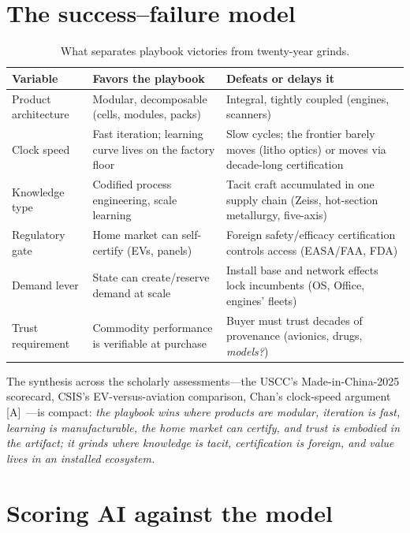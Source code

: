 \section{The success--failure model}

\begin{table}[htbp]
  \centering
  \small
  \caption{What separates playbook victories from twenty-year grinds.}
  \label{tab:analogy-model}
  \begin{tabular}{p{40mm}p{48mm}p{54mm}}
    \toprule
    Variable & Favors the playbook & Defeats or delays it \\
    \midrule
    Product architecture & Modular, decomposable (cells, modules, packs) & Integral, tightly coupled (engines, scanners) \\
    Clock speed & Fast iteration; learning curve lives on the factory floor & Slow cycles; the frontier barely moves (litho optics) or moves via decade-long certification \\
    Knowledge type & Codified process engineering, scale learning & Tacit craft accumulated in one supply chain (Zeiss, hot-section metallurgy, five-axis) \\
    Regulatory gate & Home market can self-certify (EVs, panels) & Foreign safety/efficacy certification controls access (EASA/FAA, FDA) \\
    Demand lever & State can create/reserve demand at scale & Install base and network effects lock incumbents (OS, Office, engines' fleets) \\
    Trust requirement & Commodity performance is verifiable at purchase & Buyer must trust decades of provenance (avionics, drugs, \emph{models?}) \\
    \bottomrule
  \end{tabular}
\end{table}

The synthesis across the scholarly assessments---the USCC's Made-in-China-2025 scorecard, CSIS's EV-versus-aviation comparison, Chan's clock-speed argument [A]~\cite{self-sufficiency,csis-aviation,kyle-chan}---is compact: \emph{the playbook wins where products are modular, iteration is fast, learning is manufacturable, the home market can certify, and trust is embodied in the artifact; it grinds where knowledge is tacit, certification is foreign, and value lives in an installed ecosystem.}

\section{Scoring AI against the model}

